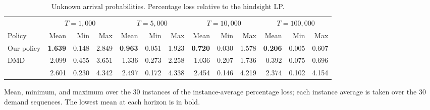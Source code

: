 \begin{table}[!htb]\centering
\caption{Unknown arrival probabilities. Percentage loss relative to the hindsight LP.}
\label{tab:numerical-unknown}
\begingroup\small\setlength{\tabcolsep}{3pt}
\begin{tabular*}{\linewidth}{@{}l@{\hspace{6pt}\extracolsep{\fill}}*{12}{r}@{}}\toprule
 & \multicolumn{3}{c}{$T=1{,}000$} & \multicolumn{3}{c}{$T=5{,}000$} & \multicolumn{3}{c}{$T=10{,}000$} & \multicolumn{3}{c}{$T=100{,}000$} \\
\cmidrule(lr){2-4}\cmidrule(lr){5-7}\cmidrule(lr){8-10}\cmidrule(lr){11-13}
Policy & Mean & Min & Max & Mean & Min & Max & Mean & Min & Max & Mean & Min & Max \\\midrule
Our policy & \textbf{1.639} & 0.148 & 2.849 & \textbf{0.963} & 0.051 & 1.923 & \textbf{0.720} & 0.030 & 1.578 & \textbf{0.206} & 0.005 & 0.607 \\
DMD & 2.099 & 0.455 & 3.651 & 1.336 & 0.273 & 2.258 & 1.036 & 0.207 & 1.736 & 0.392 & 0.075 & 0.696 \\
\citet{ma_cao_tsang_xia_2025} & 2.601 & 0.230 & 4.342 & 2.497 & 0.172 & 4.338 & 2.454 & 0.146 & 4.219 & 2.374 & 0.102 & 4.154 \\
\bottomrule\end{tabular*}
\par\vspace{3pt}\raggedright\footnotesize
Mean, minimum, and maximum over the 30 instances of the instance-average percentage loss; each instance average is taken over the 30 demand sequences. The lowest mean at each horizon is in bold.
\par\endgroup\end{table}
